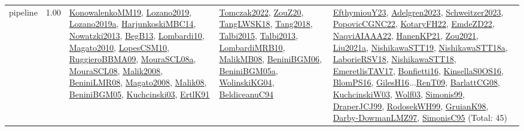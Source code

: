 {\begin{longtable}{p{3cm}r>{\raggedright\arraybackslash}p{6cm}>{\raggedright\arraybackslash}p{6cm}>{\raggedright\arraybackslash}p{8cm}}
\index{pipeline}\index{ApplicationAreas!pipeline}pipeline &  1.00 & \hyperref[detail:KonowalenkoMM19]{KonowalenkoMM19}, \hyperref[detail:Lozano2019]{Lozano2019}, \hyperref[detail:Lozano2019a]{Lozano2019a}, \hyperref[detail:HarjunkoskiMBC14]{HarjunkoskiMBC14}, \hyperref[detail:Nowatzki2013]{Nowatzki2013}, \hyperref[detail:BegB13]{BegB13}, \hyperref[detail:Lombardi10]{Lombardi10}, \hyperref[detail:Magato2010]{Magato2010}, \hyperref[detail:LopesCSM10]{LopesCSM10}, \hyperref[detail:RuggieroBBMA09]{RuggieroBBMA09}, \hyperref[detail:MouraSCL08a]{MouraSCL08a}, \hyperref[detail:MouraSCL08]{MouraSCL08}, \hyperref[detail:Malik2008]{Malik2008}, \hyperref[detail:BeniniLMR08]{BeniniLMR08}, \hyperref[detail:Magato2008]{Magato2008}, \hyperref[detail:Malik08]{Malik08}, \hyperref[detail:BeniniBGM05]{BeniniBGM05}, \hyperref[detail:Kuchcinski03]{Kuchcinski03}, \hyperref[detail:ErtlK91]{ErtlK91} & \hyperref[detail:Tomczak2022]{Tomczak2022}, \hyperref[detail:ZouZ20]{ZouZ20}, \hyperref[detail:TangLWSK18]{TangLWSK18}, \hyperref[detail:Tang2018]{Tang2018}, \hyperref[detail:Talbi2015]{Talbi2015}, \hyperref[detail:Talbi2013]{Talbi2013}, \hyperref[detail:LombardiMRB10]{LombardiMRB10}, \hyperref[detail:MalikMB08]{MalikMB08}, \hyperref[detail:BeniniBGM06]{BeniniBGM06}, \hyperref[detail:BeniniBGM05a]{BeniniBGM05a}, \hyperref[detail:WolinskiKG04]{WolinskiKG04}, \hyperref[detail:BeldiceanuC94]{BeldiceanuC94} & \hyperref[detail:EfthymiouY23]{EfthymiouY23}, \hyperref[detail:Adelgren2023]{Adelgren2023}, \hyperref[detail:Schweitzer2023]{Schweitzer2023}, \hyperref[detail:PopovicCGNC22]{PopovicCGNC22}, \hyperref[detail:KotaryFH22]{KotaryFH22}, \hyperref[detail:EmdeZD22]{EmdeZD22}, \hyperref[detail:NaqviAIAAA22]{NaqviAIAAA22}, \hyperref[detail:HanenKP21]{HanenKP21}, \hyperref[detail:Zou2021]{Zou2021}, \hyperref[detail:Liu2021a]{Liu2021a}, \hyperref[detail:NishikawaSTT19]{NishikawaSTT19}, \hyperref[detail:NishikawaSTT18a]{NishikawaSTT18a}, \hyperref[detail:LaborieRSV18]{LaborieRSV18}, \hyperref[detail:NishikawaSTT18]{NishikawaSTT18}, \hyperref[detail:EmeretlisTAV17]{EmeretlisTAV17}, \hyperref[detail:Bonfietti16]{Bonfietti16}, \hyperref[detail:KinsellaS0OS16]{KinsellaS0OS16}, \hyperref[detail:BlomPS16]{BlomPS16}, \hyperref[detail:GilesH16]{GilesH16}...\hyperref[detail:RenT09]{RenT09}, \hyperref[detail:BarlattCG08]{BarlattCG08}, \hyperref[detail:KuchcinskiW03]{KuchcinskiW03}, \hyperref[detail:Wolf03]{Wolf03}, \hyperref[detail:Simonis99]{Simonis99}, \hyperref[detail:DraperJCJ99]{DraperJCJ99}, \hyperref[detail:RodosekWH99]{RodosekWH99}, \hyperref[detail:GruianK98]{GruianK98}, \hyperref[detail:Darby-DowmanLMZ97]{Darby-DowmanLMZ97}, \hyperref[detail:SimonisC95]{SimonisC95} (Total: 45)\\

\end{longtable}}
